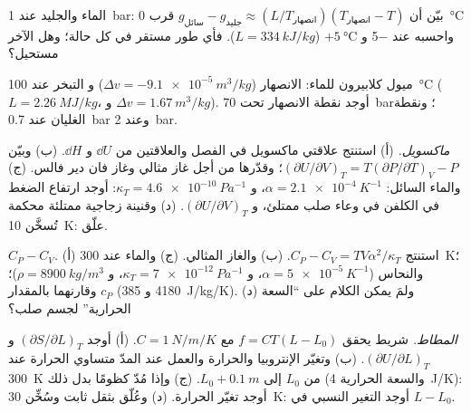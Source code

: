 \begin{exercise}[$\star$]\label{exo:b2:thermodynamic-potentials:3}
الماء والجليد عند \qty{1}{bar}: بيّن أن $g_{\text{سائل}} - g_{\text{جليد}} \approx
(L/T_{\text{انصهار}})(T_{\text{انصهار}} - T)$ قرب \qty{0}{\celsius} واحسبه
عند \qty{-5}{} و $+\qty{5}{\celsius}$ ($L = \qty{334}{kJ/kg}$). فأي طور
مستقر في كل حالة؛ وهل الآخر مستحيل؟
\end{exercise}

\begin{exercise}[$\star$]\label{exo:b2:thermodynamic-potentials:4}
ميول كلابيرون للماء: الانصهار ($\Delta v = -\qty{9.1e-5}{m^3/kg}$) و
التبخر عند \qty{100}{\celsius} ($L = \qty{2.26}{MJ/kg}$، و $\Delta v =
\qty{1.67}{m^3/kg}$). أوجد نقطة الانصهار تحت \qty{70}{bar}؛ ونقطة الغليان عند
\qty{0.7}{bar} وعند \qty{2}{bar}.
\end{exercise}

\begin{exercise}[$\star\star$]\label{exo:b2:thermodynamic-potentials:5}
\emph{ماكسويل.} (أ) استنتج علاقتي ماكسويل في الفصل
والعلاقتين من $\dd U$ و $\dd H$. (ب) وبيّن $(\partial U/\partial V)_T =
T(\partial P/\partial T)_V - P$؛ وقدّرها من أجل غاز مثالي وغاز فان
دير فالس. (ج) والماء السائل: $\alpha = \qty{2.1e-4}{K^{-1}}$، و $\kappa_T =
\qty{4.6e-10}{Pa^{-1}}$: أوجد ارتفاع الضغط في الكلفن في وعاء صلب ممتلئ،
و $(\partial U/\partial V)_T$. (د) وقنينة زجاجية ممتلئة محكمة تُسخَّن
\qty{10}{K}: علّق.
\end{exercise}

\begin{exercise}[$\star\star$]\label{exo:b2:thermodynamic-potentials:6}
\emph{$C_P - C_V$.} (أ) استنتج $C_P - C_V = TV\alpha^2/\kappa_T$. (ب)
والغاز المثالي. (ج) والماء عند \qty{300}{K}؛ والنحاس ($\alpha = \qty{5e-5}{K^{-1}}$،
و $\kappa_T = \qty{7e-12}{Pa^{-1}}$، و $\rho = \qty{8900}{kg/m^3}$)؛ وقارنهما بالمقدار
$c_P$ (\qty{4180}{} و \qty{385}{J/kg/K}). (د) ولمَ يمكن الكلام على
``السعة الحرارية'' لجسم صلب؟
\end{exercise}

\begin{exercise}[$\star\star$]\label{exo:b2:thermodynamic-potentials:7}
\emph{المطاط.} شريط يحقق $f = CT(L - L_0)$ مع $C = \qty{1}{N/m/K}$.
(أ) أوجد $(\partial S/\partial L)_T$ و $(\partial U/\partial L)_T$. (ب) وتغيّر
الإنتروبيا والحرارة والعمل عند المدّ متساوي الحرارة عند \qty{300}{K} من
$L_0$ إلى $L_0 + \qty{0.1}{m}$. (ج) وإذا مُدّ كظومًا بدل ذلك (والسعة
الحرارية \qty{4}{J/K}): أوجد تغيّر الحرارة. (د) وعُلّق بثقل ثابت
وسُخِّن \qty{30}{K}: أوجد التغير النسبي في $L - L_0$.
\end{exercise}

